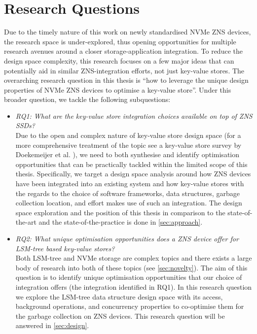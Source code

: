 \section{Research Questions}
\label{sec:researchquestions}
Due to the timely nature of this work on newly standardised NVMe ZNS devices, the research space is under-explored, thus opening opportunities for multiple research avenues around a closer storage-application integration. To reduce the design space complexity, this research focuses on a few major ideas that can potentially aid in similar ZNS-integration efforts, not just key-value stores. The overarching research question in this thesis is ``how to leverage the unique design properties of NVMe ZNS devices to optimise a key-value store”. Under this broader question, we tackle the following subquestions:
\begin{itemize}
    \item \textit{RQ1: What are the key-value store integration choices available on top of ZNS SSDs?}\\ 
    Due to the open and complex nature of key-value store design space (for a more comprehensive treatment of the topic see a key-value store survey by Doekemeijer et al. \cite{doekemeijer2022key}), we need to both synthesise and identify optimisation opportunities that can be practically tackled within the limited scope of this thesis. Specifically, we target a design space analysis around how ZNS devices have been integrated into an existing system and how key-value stores with the regards to the choice of software frameworks, data structures, garbage collection location, and effort makes use of such an integration. The design space exploration and the position of this thesis in comparison to the state-of-the-art and the state-of-the-practice is done in \autoref{sec:approach}.
    \item \textit{RQ2: What unique optimisation opportunities does a ZNS device offer for LSM-tree based key-value stores?}\\
    Both LSM-tree and NVMe storage are complex topics and there exists a large body of research into both of these topics (see \autoref{sec:novelty}). The aim of this question is to identify unique optimisation opportunities that our choice of integration offers (the integration identified in RQ1). In this research question we explore the LSM-tree data structure design space with its access, background operations, and concurrency properties to co-optimise them for the garbage collection on ZNS devices. This research question will be answered in \autoref{sec:design}.

\end{itemize}
